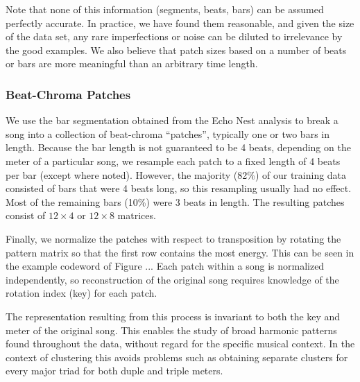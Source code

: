 \documentclass{sig-alternate}
\begin{document}

Note that none of this information (segments, beats, bars)
can be assumed perfectly accurate.
In practice, we have found them reasonable, 
and given the size of the data set, any rare imperfections or noise
can be diluted to irrelevance by the good examples.  
We also believe that patch sizes based on a number of beats or bars are more
meaningful than an arbitrary time length.


\subsubsection{Beat-Chroma Patches} \label{ssec:beatpatch}

We use the bar segmentation obtained from the Echo Nest analysis to
break a song into a collection of beat-chroma ``patches'', typically
one or two bars in length.
Because the bar length is not guaranteed to be 4 beats, 
depending on the meter of a particular
song, we resample each patch to a fixed length of 4 beats
per bar (except where noted).  However, the majority (82\%) of our training data
consisted of bars that were 4 beats long, so this resampling 
usually had no effect.  Most of the remaining bars (10\%) were 3 beats in
length.
The resulting patches consist of $12 \times 4$ or $12 \times 8$ matrices.

Finally, we normalize the patches with respect to transposition by rotating
the pattern matrix so that the first row contains the most
energy. This can be seen in the example codeword of Figure ...
Each patch within a song is normalized independently, so
reconstruction of the original song requires knowledge of the
rotation index (key) for each patch.

The representation resulting from this process is invariant to both
the key and meter of the original song.  This enables the study of
broad harmonic patterns found throughout the data, without regard for
the specific musical context.
In the context of clustering this avoids problems such as obtaining separate
clusters for every major triad for both duple and triple meters.
\end{document}
